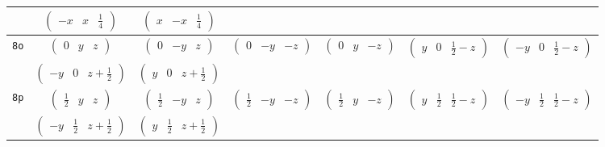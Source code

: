 \documentclass[fleqn,9pt,landscape]{jsarticle}
\begin{document}
\begin{center}
\begin{longtable}{ccccccc}
& $ \begin{pmatrix} - x & x & \frac{1}{4} \end{pmatrix} $ & $ \begin{pmatrix} x & - x & \frac{1}{4} \end{pmatrix} $ & $  $ & $  $ & $  $ & $  $ \\ \hline
{\tt 8o} & $ \begin{pmatrix} 0 & y & z \end{pmatrix} $ & $ \begin{pmatrix} 0 & - y & z \end{pmatrix} $ & $ \begin{pmatrix} 0 & - y & - z \end{pmatrix} $ & $ \begin{pmatrix} 0 & y & - z \end{pmatrix} $ & $ \begin{pmatrix} y & 0 & \frac{1}{2} - z \end{pmatrix} $ & $ \begin{pmatrix} - y & 0 & \frac{1}{2} - z \end{pmatrix} $ \\
& $ \begin{pmatrix} - y & 0 & z + \frac{1}{2} \end{pmatrix} $ & $ \begin{pmatrix} y & 0 & z + \frac{1}{2} \end{pmatrix} $ & $  $ & $  $ & $  $ & $  $ \\ \hline
{\tt 8p} & $ \begin{pmatrix} \frac{1}{2} & y & z \end{pmatrix} $ & $ \begin{pmatrix} \frac{1}{2} & - y & z \end{pmatrix} $ & $ \begin{pmatrix} \frac{1}{2} & - y & - z \end{pmatrix} $ & $ \begin{pmatrix} \frac{1}{2} & y & - z \end{pmatrix} $ & $ \begin{pmatrix} y & \frac{1}{2} & \frac{1}{2} - z \end{pmatrix} $ & $ \begin{pmatrix} - y & \frac{1}{2} & \frac{1}{2} - z \end{pmatrix} $ \\
& $ \begin{pmatrix} - y & \frac{1}{2} & z + \frac{1}{2} \end{pmatrix} $ & $ \begin{pmatrix} y & \frac{1}{2} & z + \frac{1}{2} \end{pmatrix} $ & $  $ & $  $ & $  $ & $  $ \\ \hline

\end{longtable}
\end{center}
\end{document}
